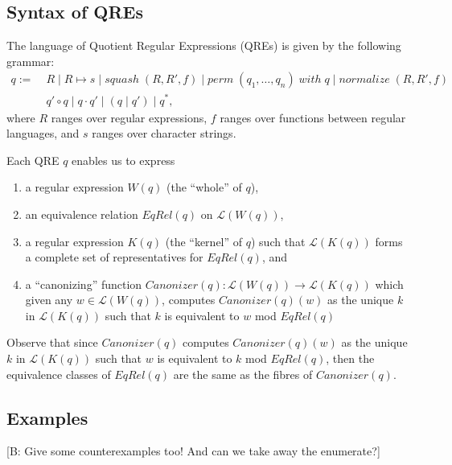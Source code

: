 \documentclass{svproc}
\newcommand{\FINISH}[3]{\ifdraft\textcolor{#1}{[#2: #3]}\fi}
\newcommand{\bcp}[1]{\FINISH{dkred}{B}{#1}}
\newcommand{\squash}[3]{\ensuremath{\mathit{squash} \; (#1, #2, #3)}}
\newcommand{\perm}[2]{\ensuremath{\mathit{perm}\; (#1)\; \mathit{with}\; #2}}
\newcommand{\normalize}[3]{\ensuremath{\mathit{normalize} \; (#1, #2, #3)}}
\newcommand{\sep}{\ensuremath{\; | \;}}
\newcommand{\canonizer}{\ensuremath{\mathit{Canonizer}}}
\begin{document}
  \subsection{Syntax of QREs}
The language of Quotient Regular Expressions (QREs) is given by the following
grammar:
\begin{align*}
q := \; &R \sep R \mapsto s \sep \squash{R}{R'}{f} \sep
\perm{q_1, \ldots, q_n}{q} \;  | \; \normalize{R}{R'}{f}\\
&q' \circ q \sep q \cdot q' \sep (q \sep q') \sep q^*,
\end{align*}
where $R$ ranges over regular expressions, $f$ ranges over functions between
regular languages, and $s$ ranges over character strings.

Each QRE $q$ enables us to express
\begin{enumerate}
  \item a regular expression $W(q)$ (the ``whole'' of $q$),
  \item an equivalence relation $EqRel(q)$ on $\mathcal{L}(W(q))$,
  \item a regular expression $K(q)$ (the ``kernel'' of $q$)
  such that $\mathcal{L}(K(q))$ forms a complete set of representatives for
  $EqRel(q)$, and
  \item a ``canonizing'' function $\canonizer(q):\mathcal{L}(W(q))
  \longrightarrow \mathcal{L}(K(q))$ which given any $w \in \mathcal{L}(W(q))$,
  computes $\canonizer(q)(w)$ as the unique $k$ in $\mathcal{L}(K(q))$ such that
  $k$ is equivalent to $w$ mod $EqRel(q)$
  \end{enumerate}
  Observe that since $\canonizer(q)$ computes $\canonizer(q)(w)$ as the unique
  $k$ in $\mathcal{L}(K(q))$ such that $w$ is equivalent to $k$ mod $EqRel(q)$,
  then the equivalence classes of $EqRel(q)$ are the same as the fibres of
  $\canonizer(q)$.

  \subsection{Examples}

\bcp{Give some counterexamples too!  And can we take away the enumerate?}
\end{document}
